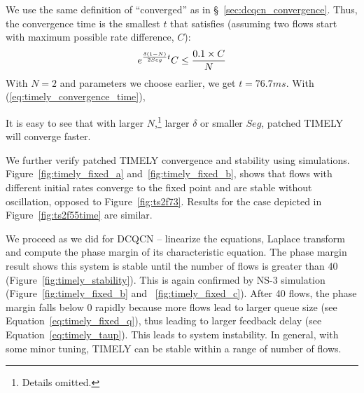 We use the same definition of ``converged'' as in
\S~\ref{sec:dcqcn_convergence}. Thus, the convergence
time is the smallest $t$ that satisfies (assuming two flows start with maximum possible rate difference, $C$):
\begin{equation}
\small
{e^{\frac{{\delta (1 - N)}}{{2Seg}}t}}C \le \frac{{0.1 \times C}}{N}
\label{eq:timely_convergence_time}
\end{equation}
With $N=2$ and parameters we choose earlier, we get $t = 76.7ms$. With (\ref{eq:timely_convergence_time}), 

It is easy to see that
with larger $N$,\footnote{Details omitted.} larger $\delta$ or smaller $Seg$, patched TIMELY will converge faster.

\fi

We further verify patched TIMELY convergence and stability using simulations.
Figure~\ref{fig:timely_fixed_a} and~\ref{fig:timely_fixed_b}, shows that flows
with different initial rates converge to the fixed point and are stable without
oscillation, opposed to Figure~\ref{fig:ts2f73}. Results for the case depicted
in Figure~\ref{fig:ts2f55time} are similar.

 We proceed as we did for DCQCN -- linearize the equations,
Laplace transform and compute the phase margin of its characteristic equation.
The phase margin result shows this system is stable until the number of flows is
greater than 40 (Figure~\ref{fig:timely_stability}).  This is again confirmed by
NS-3 simulation (Figure~\ref{fig:timely_fixed_b} and ~\ref{fig:timely_fixed_c}).
After 40 flows, the phase margin falls below 0 rapidly because more flows lead
to larger queue size (see Equation~\ref{eq:timely_fixed_q}), thus leading to
larger feedback delay (see Equation~\ref{eq:timely_taup}).  This leads to system
instability. In general, with some minor tuning, TIMELY can be stable within a
range of number of flows.
